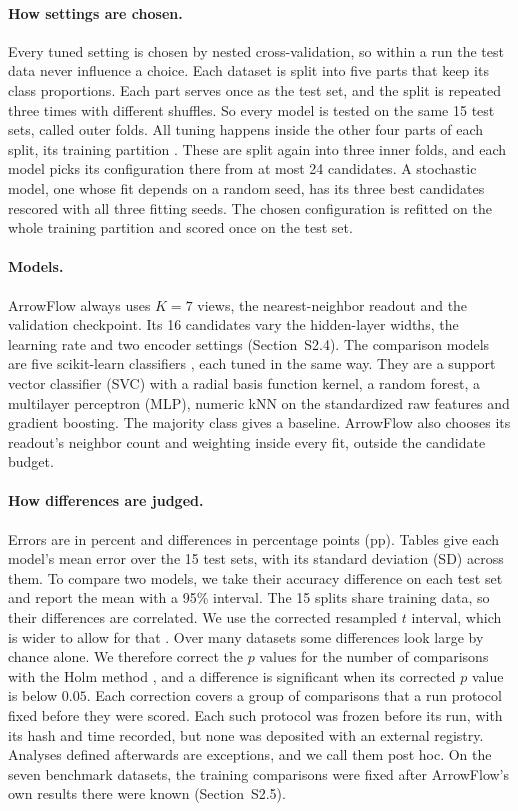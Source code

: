 \paragraph{How settings are chosen.} Every tuned setting is chosen by nested cross-validation, so within a run the test data never influence a choice. Each dataset is split into five parts that keep its class proportions. Each part serves once as the test set, and the split is repeated three times with different shuffles. So every model is tested on the same 15 test sets, called outer folds. All tuning happens inside the other four parts of each split, its training partition \citep{cawley2010selection}. These are split again into three inner folds, and each model picks its configuration there from at most 24 candidates. A stochastic model, one whose fit depends on a random seed, has its three best candidates rescored with all three fitting seeds. The chosen configuration is refitted on the whole training partition and scored once on the test set.

\paragraph{Models.} ArrowFlow always uses $K=7$ views, the nearest-neighbor readout and the validation checkpoint. Its 16 candidates vary the hidden-layer widths, the learning rate and two encoder settings (Section~S2.4). The comparison models are five scikit-learn classifiers \citep{pedregosa2011sklearn}, each tuned in the same way. They are a support vector classifier (SVC) with a radial basis function kernel, a random forest, a multilayer perceptron (MLP), numeric kNN on the standardized raw features and gradient boosting. The majority class gives a baseline. ArrowFlow also chooses its readout's neighbor count and weighting inside every fit, outside the candidate budget.

\paragraph{How differences are judged.} Errors are in percent and differences in percentage points (pp). Tables give each model's mean error over the 15 test sets, with its standard deviation (SD) across them. To compare two models, we take their accuracy difference on each test set and report the mean with a 95\% interval. The 15 splits share training data, so their differences are correlated. We use the corrected resampled $t$ interval, which is wider to allow for that \citep{nadeau2003inference,bouckaert2004evaluating}. Over many datasets some differences look large by chance alone. We therefore correct the $p$ values for the number of comparisons with the Holm method \citep{holm1979simple}, and a difference is significant when its corrected $p$ value is below $0.05$. Each correction covers a group of comparisons that a run protocol fixed before they were scored. Each such protocol was frozen before its run, with its hash and time recorded, but none was deposited with an external registry. Analyses defined afterwards are exceptions, and we call them post hoc. On the seven benchmark datasets, the training comparisons were fixed after ArrowFlow's own results there were known (Section~S2.5).

